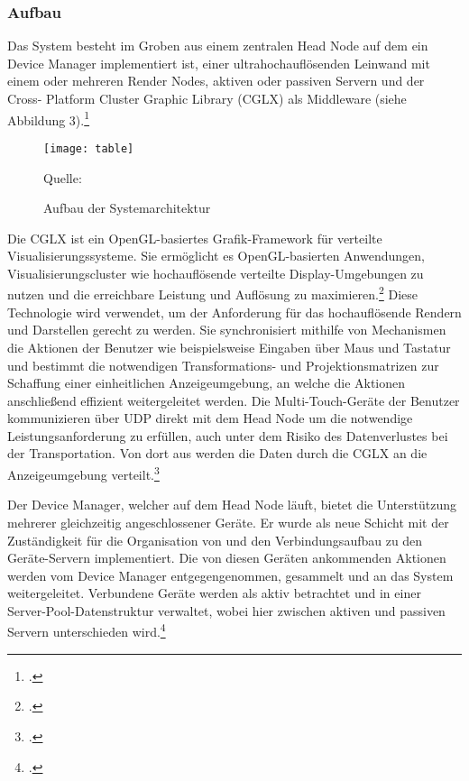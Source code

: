 \subsubsection{Aufbau}
Das System besteht im Groben aus einem zentralen Head Node auf dem ein Device Manager implementiert ist, einer ultrahochauflösenden Leinwand mit einem oder mehreren Render Nodes, aktiven oder passiven Servern und der Cross-
Platform Cluster Graphic Library (CGLX) als Middleware (siehe Abbildung 3).\footcite[Vgl.][Seite 651 f.]{Table}

\begin{figure}[H]
\begin{center}
\texttt{[image: table]}
\caption{Aufbau der Systemarchitektur}
Quelle: \cite[Seite 651]{Table}
\end{center}
\end{figure}
\vspace{-1cm}

Die CGLX ist ein OpenGL-basiertes Grafik-Framework für verteilte Visualisierungssysteme. Sie ermöglicht es OpenGL-basierten Anwendungen, Visualisierungscluster wie hochauflösende verteilte Display-Umgebungen zu nutzen und die erreichbare Leistung und Auflösung zu maximieren.\footcite[Vgl.][Seite 320]{CGLX} Diese Technologie wird verwendet, um der Anforderung für das hochauflösende Rendern und Darstellen gerecht zu werden. Sie synchronisiert mithilfe von Mechanismen die Aktionen der Benutzer wie beispielsweise Eingaben über Maus und Tastatur und bestimmt die notwendigen Transformations- und Projektionsmatrizen zur Schaffung einer einheitlichen Anzeigeumgebung, an welche die Aktionen anschließend effizient weitergeleitet werden. Die Multi-Touch-Geräte der Benutzer kommunizieren über UDP direkt mit dem Head Node um die notwendige Leistungsanforderung zu erfüllen, auch unter dem Risiko des Datenverlustes bei der Transportation. Von dort aus werden die Daten durch die CGLX an die Anzeigeumgebung verteilt.\footcite[Vgl.][Seite 651]{Table}

Der Device Manager, welcher auf dem Head Node läuft, bietet die Unterstützung mehrerer gleichzeitig angeschlossener Geräte. Er wurde als neue Schicht mit der Zuständigkeit für die Organisation von und den Verbindungsaufbau zu den Geräte-Servern implementiert. Die von diesen Geräten ankommenden Aktionen werden vom Device Manager entgegengenommen, gesammelt und an das System weitergeleitet. Verbundene Geräte werden als aktiv betrachtet und in einer Server-Pool-Datenstruktur verwaltet, wobei hier zwischen aktiven und passiven Servern unterschieden wird.\footcite[Vgl.][Seite 651]{Table}

